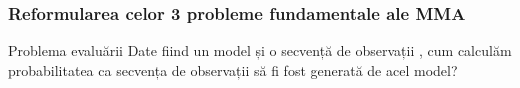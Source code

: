 \begin{frame}[T]
  \frametitle{Reformularea celor 3 probleme fundamentale ale MMA}
  
  \begin{block}{Problema evaluării}
    Date fiind un model  și o
    secvență de observații , cum calculăm probabilitatea  ca secvența de observații să fi fost
    generată de acel model?
  \end{block}
\end{frame}


